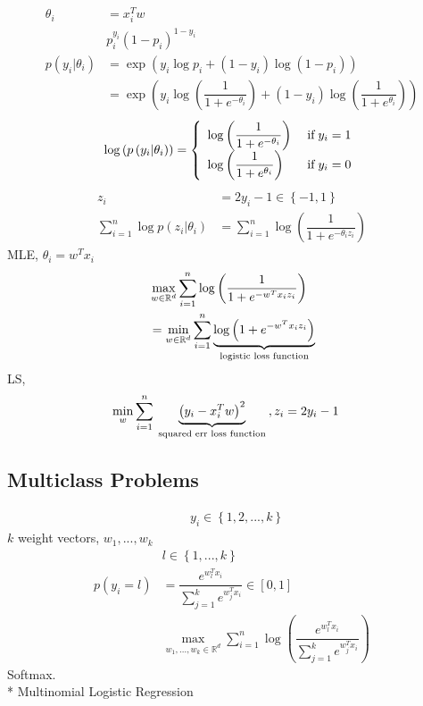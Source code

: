 \documentclass{article}
\begin{document}
\begin{align*}
\theta_{i} &= x_{i}^{T} w 
\\ &  p_{i}^{y_{i}} \left(1 - p_{i}\right)^{1 - y_{i}}
\\ p\left(y_{i} | \theta_{i}\right)  &= \exp\left(y_{i} \log p_{i} + \left(1 - y_{i}\right) \log \left(1 - p_{i}\right)\right)
\\ &= \exp\left(y_{i} \log \left(\dfrac{1}{1 + e^{-\theta_{i}}}\right) + \left(1 - y_{i}\right) \log \left(\dfrac{1}{1 + e^{\theta_{i}}}\right)\right)
\end{align*}
\[ \log\left(p\left(y_{i} | \theta_{i}\right)\right) =\left\{ \begin{array}{ll}
\log\left(\dfrac{1}{1 + e^{-\theta_{i}}}\right)& \text{\;if\;} y_{i} = 1 \\
\log\left(\dfrac{1}{1 + e^{\theta_{i}}}\right)& \text{\;if\;} y_{i} = 0 \\
\end{array}\right. \]
\begin{align*}
z_{i} &= 2 y_{i} - 1 \in \left\{-1, 1\right\}
\\ \displaystyle\sum_{i=1}^{n} \log p\left(z_{i} | \theta_{i}\right) &= \displaystyle\sum_{i=1}^{n} \log \left(\dfrac{1}{1 + e^{-\theta_{i} z_{i}}}\right)
\end{align*}
MLE, $\theta_{i} = w^{T} x_{i}$
\begin{align*}
&  \displaystyle\max_{w \in \mathbb{R}^{d}} \displaystyle\sum_{i=1}^{n} \log\left(\dfrac{1}{1 + e^{- w^{T} x_{i} z_{i}}}\right)
\\ &= \displaystyle\min_{w \in \mathbb{R}^{d}} \displaystyle\sum_{i=1}^{n} \underbrace{ \log\left(1 + e^{- w^{T} x_{i} z_{i}}\right) }_{\text{\;logistic loss function\;}}
\end{align*}
LS,
\begin{align*}
\displaystyle\min_{w} \displaystyle\sum_{i=1}^{n} \underbrace{\left(y_{i} - x_{i}^{T} w\right)^{2} }_{\text{\;squared err loss function\;}}, z_{i} &= 2 y_{i} - 1
\end{align*}


\subsection{Multiclass Problems}
\begin{align*}
&y_{i} \in \left\{1, 2, ..., k \right\}
\end{align*}
$k $ weight vectors, $w_{1}, ..., w_{k}$
\begin{align*}
&l  \in \left\{1, ..., k \right\}
\\ p\left(y_{i} = l\right)  &= \dfrac{e^{w_{l}^{T} x_{i}}}{\displaystyle\sum_{j=1}^{k} e^{w_{j}^{T} x_{i}}} \in \left[0, 1\right]
\\ &  \displaystyle\max_{w_{1}, ..., w_{k} \in \mathbb{R}^{d}} \displaystyle\sum_{i=1}^{n} \log \left(\dfrac{e^{w_{l}^{T} x_{i}}}{\displaystyle\sum_{j=1}^{k} e^{w_{j}^{T} x_{i}}}\right)
\end{align*}
Softmax.
\\* Multinomial Logistic Regression
\end{document}
